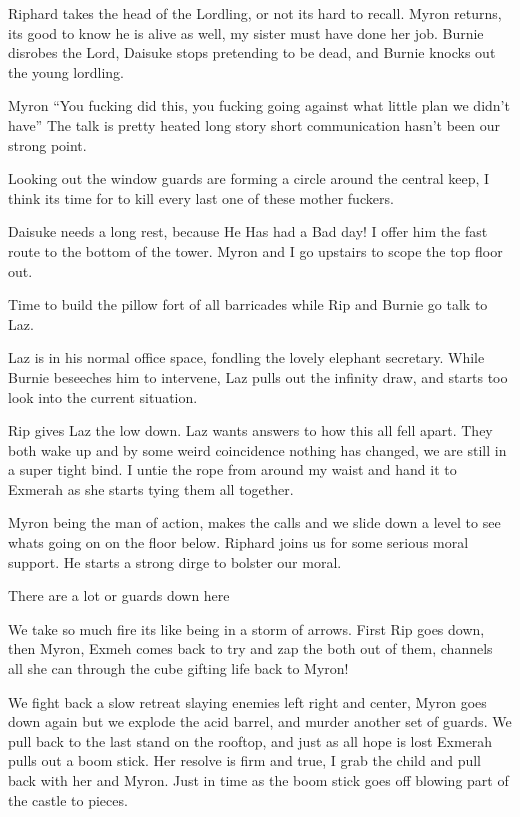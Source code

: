 Riphard takes the head of the Lordling, or not its hard to recall. Myron returns, its good to know he is alive as well, my sister must have done her job. Burnie disrobes the Lord, Daisuke stops pretending to be dead, and Burnie knocks out the young lordling.\medskip

Myron ``You fucking did this, you fucking going against what little plan we didn't have''
The talk is pretty heated long story short communication hasn't been our strong point.\medskip

Looking out the window guards are forming a circle around the central keep, I think its time for to kill every last one of these mother fuckers.\medskip

Daisuke needs a long rest, because He Has had a Bad day! I offer him the fast route to the bottom of the tower. Myron and I go upstairs to scope the top floor out.\medskip

Time to build the pillow fort of all barricades while Rip and Burnie go talk to Laz.\medskip

Laz is in his normal office space, fondling the lovely elephant secretary. While Burnie beseeches him to intervene, Laz pulls out the infinity draw, and starts too look into the current situation.\medskip

Rip gives Laz the low down. Laz wants answers to how this all fell apart. They both wake up and by some weird coincidence nothing has changed, we are still in a super tight bind. I untie the rope from around my waist and hand it to Exmerah as she starts tying them all together.\medskip

Myron being the man of action, makes the calls and we slide down a level to see whats going on on the floor below. Riphard joins us for some serious moral support. He starts a strong dirge to bolster our moral.\medskip

There are a lot or guards down here\medskip

We take so much fire its like being in a storm of arrows. First Rip goes down, then Myron, Exmeh comes back to try and zap the both out of them, channels all she can through the cube gifting life back to Myron!\medskip

We fight back a slow retreat slaying enemies left right and center, Myron goes down again but we explode the acid barrel, and murder another set of guards. We pull back to the last stand on the rooftop, and just as all hope is lost Exmerah pulls out a boom stick. Her resolve is firm and true, I grab the child and pull back with her and Myron. Just in time as the boom stick goes off blowing part of the castle to pieces.\medskip

